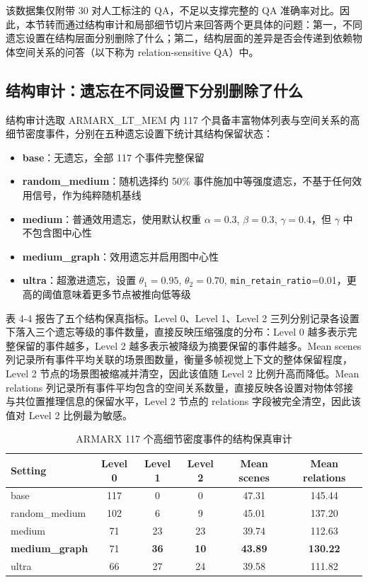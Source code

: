 该数据集仅附带 30 对人工标注的 QA，不足以支撑完整的 QA 准确率对比。因此，本节转而通过结构审计和局部细节切片来回答两个更具体的问题：第一，不同遗忘设置在结构层面分别删除了什么；第二，结构层面的差异是否会传递到依赖物体空间关系的问答（以下称为 relation-sensitive QA）中。

\subsection{结构审计：遗忘在不同设置下分别删除了什么}

结构审计选取 ARMARX\_LT\_MEM 内 117 个具备丰富物体列表与空间关系的高细节密度事件，分别在五种遗忘设置下统计其结构保留状态：

\begin{itemize}
\item \textbf{base}：无遗忘，全部 117 个事件完整保留
\item \textbf{random\_medium}：随机选择约 50\% 事件施加中等强度遗忘，不基于任何效用信号，作为纯粹随机基线
\item \textbf{medium}：普通效用遗忘，使用默认权重 $\alpha=0.3$, $\beta=0.3$, $\gamma=0.4$，但 $\gamma$ 中不包含图中心性
\item \textbf{medium\_graph}：效用遗忘并启用图中心性
\item \textbf{ultra}：超激进遗忘，设置 $\theta_1=0.95$, $\theta_2=0.70$, \texttt{min\_retain\_ratio}=0.01，更高的阈值意味着更多节点被推向低等级
\end{itemize}

表 4-4 报告了五个结构保真指标。Level 0、Level 1、Level 2 三列分别记录各设置下落入三个遗忘等级的事件数量，直接反映压缩强度的分布：Level 0 越多表示完整保留的事件越多，Level 2 越多表示被降级为摘要保留的事件越多。Mean scenes 列记录所有事件平均关联的场景图数量，衡量多帧视觉上下文的整体保留程度，Level 2 节点的场景图被缩减并清空，因此该值随 Level 2 比例升高而降低。Mean relations 列记录所有事件平均包含的空间关系数量，直接反映各设置对物体邻接与共位置推理信息的保留水平，Level 2 节点的 relations 字段被完全清空，因此该值对 Level 2 比例最为敏感。

\begin{table}[htbp]
\centering
\caption{ARMARX 117 个高细节密度事件的结构保真审计}
\label{tab:4-4}
\begin{tabular}{lccccc}
\toprule
Setting & Level 0 & Level 1 & Level 2 & Mean scenes & Mean relations \\
\midrule
base & 117 & 0 & 0 & 47.31 & 145.44 \\
random\_medium & 102 & 6 & 9 & 45.01 & 137.20 \\
medium & 71 & 23 & 23 & 39.74 & 112.63 \\
\textbf{medium\_graph} & 71 & \textbf{36} & \textbf{10} & \textbf{43.89} & \textbf{130.22} \\
ultra & 66 & 27 & 24 & 39.58 & 111.82 \\
\bottomrule
\end{tabular}
\end{table}

